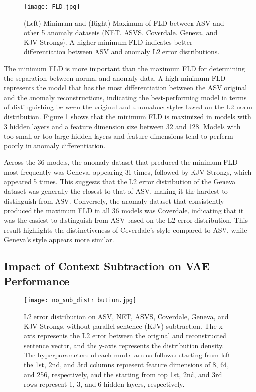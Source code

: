 \begin{figure}[htbp]
    \centering
    \texttt{[image: FLD.jpg]}
    \caption{(Left) Minimum and (Right) Maximum of FLD between ASV and other 5 anomaly datasets (NET, ASVS, Coverdale, Geneva, and KJV Strongs). A higher minimum FLD indicates better differentiation between ASV and anomaly L2 error distributions.}
    \label{fig:appendix_fld}
\end{figure}

The minimum FLD is more important than the maximum FLD for determining the separation between normal and anomaly data. A high minimum FLD represents the model that has the most differentiation between the ASV original and the anomaly reconstructions, indicating the best-performing model in terms of distinguishing between the original and anomalous styles based on the L2 norm distribution. Figure \ref{fig:appendix_fld} shows that the minimum FLD is maximized in models with 3 hidden layers and a feature dimension size between 32 and 128. Models with too small or too large hidden layers and feature dimensions tend to perform poorly in anomaly differentiation.

Across the 36 models, the anomaly dataset that produced the minimum FLD most frequently was Geneva, appearing 31 times, followed by KJV Strongs, which appeared 5 times. This suggests that the L2 error distribution of the Geneva dataset was generally the closest to that of ASV, making it the hardest to distinguish from ASV. Conversely, the anomaly dataset that consistently produced the maximum FLD in all 36 models was Coverdale, indicating that it was the easiest to distinguish from ASV based on the L2 error distribution. This result highlights the distinctiveness of Coverdale's style compared to ASV, while Geneva's style appears more similar.

\subsection{Impact of Context Subtraction on VAE Performance}

\begin{figure}[htbp]
    \centering
    \texttt{[image: no\_sub\_distribution.jpg]}
    \caption{L2 error distribution on ASV, NET, ASVS, Coverdale, Geneva, and KJV Strongs, without parallel sentence (KJV) subtraction. The x-axis represents the L2 error between the original and reconstructed sentence vector, and the y-axis represents the distribution density. The hyperparameters of each model are as follows: starting from left the 1st, 2nd, and 3rd columns represent feature dimensions of 8, 64, and 256, respectively, and the starting from top 1st, 2nd, and 3rd rows represent 1, 3, and 6 hidden layers, respectively.}
    \label{fig:appendix_no_sub_l2_error}
\end{figure}

